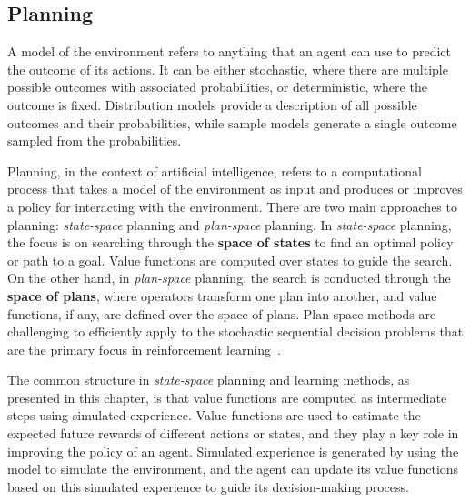 \documentclass[../xlapes02]{subfiles}
\begin{document}
    \subsection{Planning}\label{subsec:planning}
    A model of the environment refers to anything that an agent can use to predict the outcome of its actions. It can be either stochastic, where there are multiple possible outcomes with associated probabilities, or deterministic, where the outcome is fixed. Distribution models provide a description of all possible outcomes and their probabilities, while sample models generate a single outcome sampled from the probabilities.

    Planning, in the context of artificial intelligence, refers to a computational process that takes a model of the environment as input and produces or improves a policy for interacting with the environment. There are two main approaches to planning: \emph{state-space} planning and \emph{plan-space} planning. In \emph{state-space} planning, the focus is on searching through the \textbf{space of states} to find an optimal policy or path to a goal. Value functions are computed over states to guide the search. On the other hand, in \emph{plan-space} planning, the search is conducted through the \textbf{space of plans}, where operators transform one plan into another, and value functions, if any, are defined over the space of plans. Plan-space methods are challenging to efficiently apply to the stochastic sequential decision problems that are the primary focus in reinforcement learning~\cite{sutton2018reinforcement}.

    The common structure in \emph{state-space} planning and learning methods, as presented in this chapter, is that value functions are computed as intermediate steps using simulated experience. Value functions are used to estimate the expected future rewards of different actions or states, and they play a key role in improving the policy of an agent. Simulated experience is generated by using the model to simulate the environment, and the agent can update its value functions based on this simulated experience to guide its decision-making process.

    \begin{center}
    \end{center}
\end{document}
